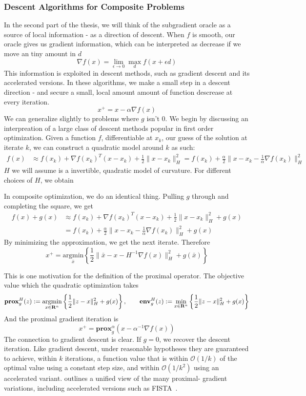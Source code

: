 \subsubsection{Descent Algorithms for Composite Problems}
In the second part of the thesis, we will think of the subgradient oracle as a
source of local information - as a direction of descent. When $f$ is smooth,
our oracle gives us gradient information, which can be interpreted as decrease
if we move an tiny amount in $d$
$$
\nabla f(x) = \lim_{\epsilon \rightarrow 0}\max_d f(x + \epsilon d)
$$
This information is exploited in descent methods, such as gradient
descent and its accelerated versions. In these algorithms, we make a 
small step in a descent direction - and secure a small, local amount
amount of function descrease at every iteration. 
$$
x^+ = x - \alpha \nabla f(x)
$$
We can generalize slightly to problems where $g$ isn't $0$. We begin by
discussing an interpreation of a large class of descent methods popular in
first order optimization. Given a  function $f$, differentiable at $x_k$, our
guess of the solution at  iterate $k$, we can construct a quadratic model
around $k$ as such:
\begin{align*} 
f(x) & \approx f(x_{k})+\nabla f(x_{k})^{T}(x-x_{k})+\frac{1}{2}\|x-x_{k}\|_{H}^{2} =f(x_{k})+\frac{\alpha}{2}\|x-x_{k}-\frac{1}{\alpha}\nabla f(x_{k})\|_H^{2}
\end{align*}
$H$ we will assume is a invertible, quadratic model of curvature. For
different choices of $H$, we obtain

In composite optimization, we do an identical thing. Pulling $g$ 
through and completing the square, we get
\begin{align*}
f(x)+g(x) & \approx f(x_{k})+\nabla f(x_{k})^{T}(x-x_{k})+\frac{1}{2}\|x-x_{k}\|_{H}^{2}+g(x)\\
 & =f(x_{k})+\frac{\alpha}{2}\|x-x_{k}-\frac{1}{\alpha}\nabla f(x_{k})\|_H^{2}+g(x)
\end{align*}
By minimizing the approximation, we get the next iterate. Therefore
$$
x^{+}=\underset{\bar{x}}{\mbox{argmin}}\left\{ 
\frac{1}{2}\|\bar{x}-x-H^{-1}\nabla f(x)\|_{H}^{2}
+g(\bar{x})\right\} 
$$

This is one
motivation for the definition of the proximal operator. The objective
value which the quadratic optimization takes $$
\mathbf{prox}^H_{g}(z):  =\underset{x\in\mathbf{R}^{n}}{\text{argmin}}\left\{
\frac{1}{2}\|z-x\|_H^{2}+g(x)\right\}, \qquad  \mathbf{env}^H_{g}(z):
=\underset{x\in\mathbf{R}^{n}}{\text{min}}\left\{
\frac{1}{2}\|z-x\|_H^{2}+g(x)\right\}  $$ And the proximal gradient
iteration is 
\begin{equation}\label{eq:prox-gradient}
x^{+}=\mathbf{prox}^\alpha_g(x-\alpha^{-1}\nabla f(x))
\end{equation}
The connection to gradient descent is clear. If $g=0$, we recover
the descent iteration. Like gradient descent, under reasonable
hypotheses they are guaranteed to achieve, within $k$ iterations, a
function value that is within $\mathcal{O}(1/k)$ of the optimal value
using a constant step size, and within $\mathcal{O}(1/k^2)$ using an
accelerated variant. \cite{Tseng:2010} outlines a unified view of the
many proximal- gradient variations, including accelerated versions
such as FISTA~\cite{beck2009fast}.

